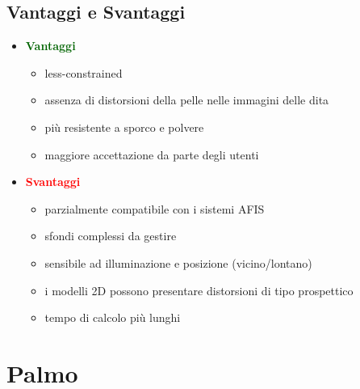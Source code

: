 \documentclass{report}
\begin{document}
\newpage
\section{Vantaggi e Svantaggi}

\begin{itemize}
    \item \textcolor{darkgreen}{\textbf{Vantaggi}}
    \begin{itemize}
        \item less-constrained
        \item assenza di distorsioni della pelle nelle immagini delle dita 
        \item più resistente a sporco e polvere 
        \item maggiore accettazione da parte degli utenti
    \end{itemize}
    \item \textcolor{red}{\textbf{Svantaggi}}
    \begin{itemize}
        \item parzialmente compatibile con i sistemi AFIS
        \item sfondi complessi da gestire 
        \item sensibile ad illuminazione e posizione (vicino/lontano)
        \item i modelli 2D possono presentare distorsioni di tipo prospettico
        \item tempo di calcolo più lunghi
    \end{itemize}
\end{itemize}

\chapter{Palmo}
\end{document}

